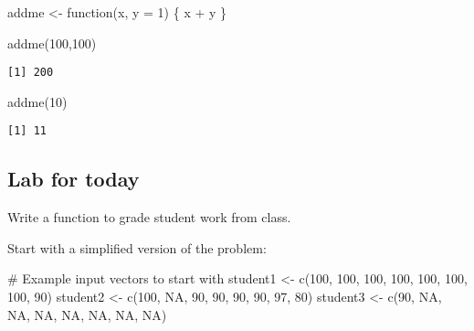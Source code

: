\documentclass[
  letterpaper,
  DIV=11,
  numbers=noendperiod]{scrartcl}
\newenvironment{Shaded}{\begin{snugshade}}{\end{snugshade}}
\newcommand{\AttributeTok}[1]{\textcolor[rgb]{0.40,0.45,0.13}{#1}}
\newcommand{\CommentTok}[1]{\textcolor[rgb]{0.37,0.37,0.37}{#1}}
\newcommand{\ConstantTok}[1]{\textcolor[rgb]{0.56,0.35,0.01}{#1}}
\newcommand{\ControlFlowTok}[1]{\textcolor[rgb]{0.00,0.23,0.31}{#1}}
\newcommand{\DecValTok}[1]{\textcolor[rgb]{0.68,0.00,0.00}{#1}}
\newcommand{\FunctionTok}[1]{\textcolor[rgb]{0.28,0.35,0.67}{#1}}
\newcommand{\NormalTok}[1]{\textcolor[rgb]{0.00,0.23,0.31}{#1}}
\newcommand{\OtherTok}[1]{\textcolor[rgb]{0.00,0.23,0.31}{#1}}
\newcommand{\SpecialCharTok}[1]{\textcolor[rgb]{0.37,0.37,0.37}{#1}}
\begin{document}
\begin{Shaded}
\begin{Highlighting}[]
\NormalTok{addme }\OtherTok{\textless{}{-}} \ControlFlowTok{function}\NormalTok{(x, }\AttributeTok{y =} \DecValTok{1}\NormalTok{) \{}
\NormalTok{  x }\SpecialCharTok{+}\NormalTok{ y}
\NormalTok{\}}
\end{Highlighting}
\end{Shaded}

\begin{Shaded}
\begin{Highlighting}[]
\FunctionTok{addme}\NormalTok{(}\DecValTok{100}\NormalTok{,}\DecValTok{100}\NormalTok{)}
\end{Highlighting}
\end{Shaded}

\begin{verbatim}
[1] 200
\end{verbatim}

\begin{Shaded}
\begin{Highlighting}[]
\FunctionTok{addme}\NormalTok{(}\DecValTok{10}\NormalTok{)}
\end{Highlighting}
\end{Shaded}

\begin{verbatim}
[1] 11
\end{verbatim}

\hypertarget{lab-for-today}{%
\subsection{Lab for today}\label{lab-for-today}}

Write a function to grade student work from class.

Start with a simplified version of the problem:

\begin{Shaded}
\begin{Highlighting}[]
\CommentTok{\# Example input vectors to start with}
\NormalTok{student1 }\OtherTok{\textless{}{-}} \FunctionTok{c}\NormalTok{(}\DecValTok{100}\NormalTok{, }\DecValTok{100}\NormalTok{, }\DecValTok{100}\NormalTok{, }\DecValTok{100}\NormalTok{, }\DecValTok{100}\NormalTok{, }\DecValTok{100}\NormalTok{, }\DecValTok{100}\NormalTok{, }\DecValTok{90}\NormalTok{)}
\NormalTok{student2 }\OtherTok{\textless{}{-}} \FunctionTok{c}\NormalTok{(}\DecValTok{100}\NormalTok{, }\ConstantTok{NA}\NormalTok{, }\DecValTok{90}\NormalTok{, }\DecValTok{90}\NormalTok{, }\DecValTok{90}\NormalTok{, }\DecValTok{90}\NormalTok{, }\DecValTok{97}\NormalTok{, }\DecValTok{80}\NormalTok{)}
\NormalTok{student3 }\OtherTok{\textless{}{-}} \FunctionTok{c}\NormalTok{(}\DecValTok{90}\NormalTok{, }\ConstantTok{NA}\NormalTok{, }\ConstantTok{NA}\NormalTok{, }\ConstantTok{NA}\NormalTok{, }\ConstantTok{NA}\NormalTok{, }\ConstantTok{NA}\NormalTok{, }\ConstantTok{NA}\NormalTok{, }\ConstantTok{NA}\NormalTok{)}
\end{Highlighting}
\end{Shaded}
\end{document}
